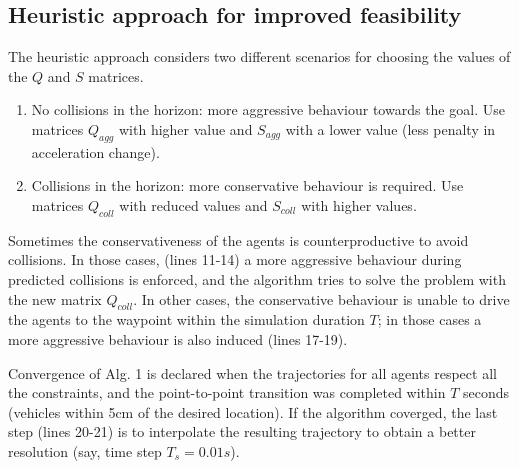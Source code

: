 \subsection{Heuristic approach for improved feasibility}
The heuristic approach considers two different scenarios for choosing the values of the $Q$ and $S$ matrices.
\begin{enumerate}
	\item No collisions in the horizon: more aggressive behaviour towards the goal. Use matrices $Q_{agg}$ with higher value and $S_{agg}$ with a lower value (less penalty in acceleration change).
	\item Collisions in the horizon: more conservative behaviour is required. Use matrices $Q_{coll}$ with reduced values and $S_{coll}$ with higher values.
\end{enumerate}

Sometimes the conservativeness of the agents is counterproductive to avoid collisions. In those cases, (lines 11-14) a more aggressive behaviour during predicted collisions is enforced, and the algorithm tries to solve the problem with the new matrix $Q_{coll}$. In other cases, the conservative behaviour is unable to drive the agents to the waypoint within the simulation duration $T$; in those cases a more aggressive behaviour is also induced (lines 17-19). 

Convergence of Alg. 1 is declared when the trajectories for all agents respect all the constraints, and the point-to-point transition was completed within $T$ seconds (vehicles within 5cm of the desired location). If the algorithm coverged, the last step (lines 20-21) is to interpolate the resulting trajectory to obtain a better resolution (say, time step $T_s = 0.01s$).